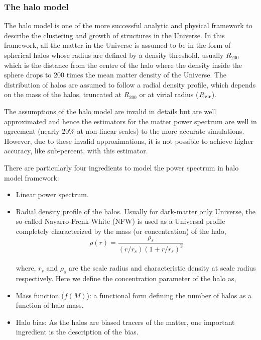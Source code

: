 \subsubsection{The halo model}

The halo model is one of the more successful analytic and physical framework to describe
the clustering and growth of structures in the Universe. In this framework, all the matter
in the Universe is assumed to be in the form of spherical halos whose radius are defined by a 
density threshold, usually $R_{200}$ which is the distance from the centre of the halo where
the density inside the sphere drops to 200 times the mean matter density of the Universe. 
The  distribution of halos are assumed to follow a radial density 
profile, which depends on the mass of the halos, truncated at $R_{200}$ or at virial 
radius ($R_{\rm vir}$).

The assumptions of the halo model are invalid in details but are well approximated and 
hence the estimators for the matter power spectrum are well in agreement 
(nearly 20$\%$ at non-linear scales)
to the more accurate simulations. However, due to these invalid approximations, it is not
possible to achieve higher accuracy, like sub-percent, with this estimator. 

There are particularly four ingredients to model the power spectrum in halo model framework:

\begin{itemize}
	\item Linear power spectrum.

	\item Radial density profile of the halos. Usually for dark-matter only Universe, the so-called
			Navarro-Frenk-White (NFW) is used as a Universal profile completely characterized by the
			mass (or concentration) of the halo,
			\begin{equation}
				\rho(r) = \dfrac{\rho_s}{(r/r_s)(1+r/r_s)^2}
			\end{equation}
			\\
			where, $r_s$ and $\rho_s$ are the scale radius and characteristic density at scale radius
			respectively. Here we define the concentration parameter of the halo as,

	\item Mass function ($f(M)$): a functional form defining the number of halos as a function of halo
			mass. 

	\item Halo bias: As the halos are biased tracers of the matter, one important ingredient is 
			the description of the bias.  
\end{itemize}

